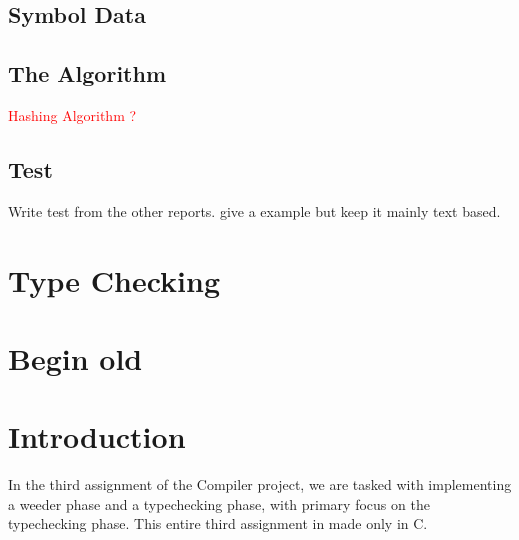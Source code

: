 \documentclass[a4paper,10pt,titlepage]{report}
\begin{document}
\subsection{Symbol Data}

\subsection{The Algorithm}
\textcolor{red}{Hashing Algorithm ?}

\subsection{Test}
Write test from the other reports. give a example but keep it mainly text based.

\section{Type Checking}
\section{Begin old}

\section{Introduction}
In the third assignment of the Compiler project, we are tasked with implementing a weeder phase and a typechecking phase, with primary focus on the typechecking phase. This entire third assignment in made only in C.
\end{document}
